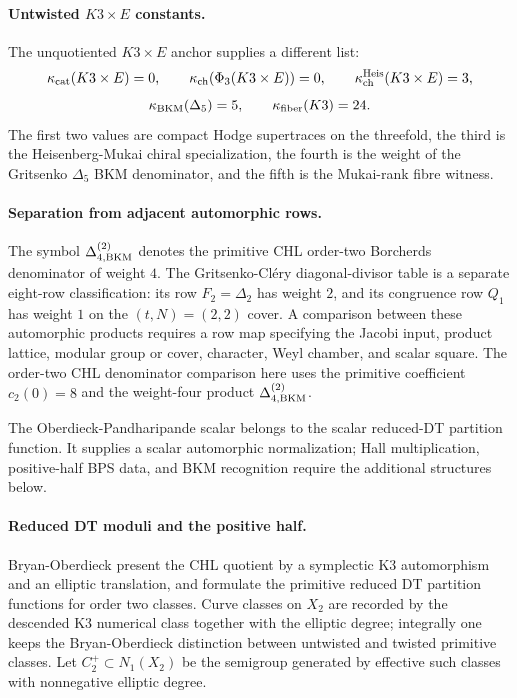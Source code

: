 \paragraph{Untwisted $K3\times E$ constants.}
The unquotiented $K3\times E$ anchor supplies a different list:
\[
  \kappa_{\mathrm{cat}}(K3\times E)=0,\qquad
  \kappa_{\mathrm{ch}}(\Phi_3(K3\times E))=0,\qquad
  \kappa_{\mathrm{ch}}^{\mathrm{Heis}}(K3\times E)=3,
\]
\[
  \kappa_{\mathrm{BKM}}(\Delta_5)=5,\qquad
  \kappa_{\mathrm{fiber}}(K3)=24 .
\]
The first two values are compact Hodge supertraces on the threefold, the
third is the Heisenberg-Mukai chiral specialization, the fourth is the
weight of the Gritsenko $\Delta_5$ BKM denominator, and the fifth is the
Mukai-rank fibre witness.

\paragraph{Separation from adjacent automorphic rows.}
The symbol $\Delta^{(2)}_{4,\mathrm{BKM}}$ denotes the primitive CHL order-two
Borcherds denominator of weight $4$.  The Gritsenko-Cl\'ery
diagonal-divisor table is a separate eight-row classification: its row
$F_2=\Delta_2$ has weight $2$, and its congruence row
$Q_1$ has weight $1$ on the $(t,N)=(2,2)$ cover.  A comparison between
these automorphic products requires a row map specifying the Jacobi
input, product lattice, modular group or cover, character, Weyl chamber,
and scalar square.  The order-two CHL denominator comparison here uses
the primitive coefficient $c_2(0)=8$ and the weight-four product
$\Delta^{(2)}_{4,\mathrm{BKM}}$.

The Oberdieck-Pandharipande scalar belongs to the scalar reduced-DT
partition function.  It supplies a scalar automorphic normalization;
Hall multiplication, positive-half BPS data, and BKM recognition require
the additional structures below.

\paragraph{Reduced DT moduli and the positive half.}
Bryan-Oberdieck present the CHL quotient by a symplectic K3 automorphism
and an elliptic translation, and formulate the primitive reduced DT
partition functions for order two classes.  Curve classes on $X_2$ are
recorded by the descended K3 numerical class together with the elliptic
degree; integrally one keeps the Bryan-Oberdieck distinction between
untwisted and twisted primitive classes.  Let $C_2^+\subset N_1(X_2)$ be
the semigroup generated by effective such classes with nonnegative
elliptic degree.

